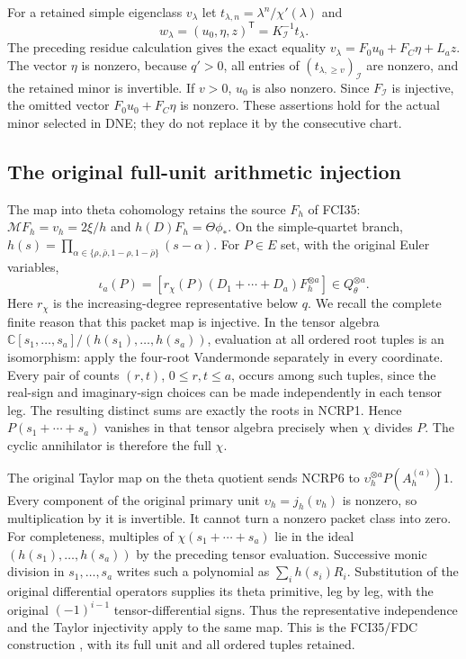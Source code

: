 For a retained simple eigenclass $v_\lambda$ let
$t_{\lambda,n}=\lambda^n/\chi'(\lambda)$ and
\[
 w_\lambda=(u_0,\eta,z)^{\mathsf T}
                  =K_{\mathcal I}^{-1}t_\lambda .
 \tag{NCRP5}
\]
The preceding residue calculation gives the exact equality
$v_\lambda=F_0u_0+F_C\eta+L_az$.
The vector $\eta$ is nonzero, because $q'>0$, all entries of
$(t_{\lambda,\ge v})_{\mathcal I}$ are nonzero, and the retained
minor is invertible. If $v>0$, $u_0$ is also nonzero.
Since $F_{\mathcal I}$ is injective, the omitted vector
$F_0u_0+F_C\eta$ is nonzero. These assertions hold for the actual
minor selected in DNE; they do not replace it by the consecutive chart.

\subsection{The original full-unit arithmetic injection}

The map into theta cohomology retains the source $F_h$ of FCI35:
$\mathcal M F_h=v_h=2\xi/h$ and $h(D)F_h=\Theta\phi_*$.
On the simple-quartet branch,
$h(s)=\prod_{\alpha\in\{\rho,\bar\rho,1-\rho,1-\bar\rho\}}(s-\alpha)$.
For $P\in E$ set, with the original Euler variables,
\[
 \iota_a(P)=
 [r_\chi(P)(D_1+\cdots+D_a)F_h^{\otimes a}]
            \in Q_\theta^{\otimes a}.
 \tag{NCRP6}
\]
Here $r_\chi$ is the increasing-degree representative below $q$.
We recall the complete finite reason that this packet map is injective.
In the tensor algebra
$\mathbb C[s_1,\ldots,s_a]/(h(s_1),\ldots,h(s_a))$,
evaluation at all ordered root tuples is an isomorphism: apply the
four-root Vandermonde separately in every coordinate.
Every pair of counts $(r,t)$, $0\le r,t\le a$, occurs among such
tuples, since the real-sign and imaginary-sign choices can be made
independently in each tensor leg. The resulting distinct sums are
exactly the roots in NCRP1. Hence $P(s_1+\cdots+s_a)$ vanishes
in that tensor algebra precisely when $\chi$ divides $P$.
The cyclic annihilator is therefore the full $\chi$.

The original Taylor map on the theta quotient sends NCRP6 to
$\upsilon_h^{\otimes a}P(A_h^{(a)})1$.
Every component of the original primary unit $\upsilon_h=j_h(v_h)$
is nonzero, so multiplication by it is invertible. It cannot turn
a nonzero packet class into zero.
For completeness, multiples of $\chi(s_1+\cdots+s_a)$ lie in the
ideal $(h(s_1),\ldots,h(s_a))$ by the preceding tensor evaluation.
Successive monic division in $s_1,\ldots,s_a$ writes such a polynomial
as $\sum_i h(s_i)R_i$. Substitution of the original differential
operators supplies its theta primitive, leg by leg, with the original
$(-1)^{i-1}$ tensor-differential signs. Thus the representative
independence and the Taylor injectivity apply to the same map.
This is the FCI35/FDC construction \cite{prog:FCI}, with its full
unit and all ordered tuples retained.

